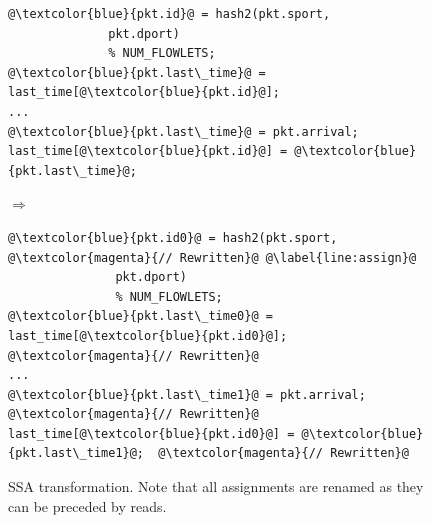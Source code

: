 \begin{figure}[!t]
  \begin{minipage}{\textwidth}
  \begin{minipage}{0.4\textwidth}
  \begin{small}
  \begin{lstlisting}[style=customc, numbers=none, frame=none]
@\textcolor{blue}{pkt.id}@ = hash2(pkt.sport,
              pkt.dport)
              % NUM_FLOWLETS;
@\textcolor{blue}{pkt.last\_time}@ = last_time[@\textcolor{blue}{pkt.id}@];
...
@\textcolor{blue}{pkt.last\_time}@ = pkt.arrival;
last_time[@\textcolor{blue}{pkt.id}@] = @\textcolor{blue}{pkt.last\_time}@;
  \end{lstlisting}
  \end{small}
  \end{minipage}
  $\Longrightarrow$
  \hspace{-0.2in}
%
  \begin{minipage}{0.6\textwidth}
  \begin{small}
  \begin{lstlisting}[style=customc, numbers=none, frame=none]
@\textcolor{blue}{pkt.id0}@ = hash2(pkt.sport,          @\textcolor{magenta}{// Rewritten}@ @\label{line:assign}@
               pkt.dport)
               % NUM_FLOWLETS;  
@\textcolor{blue}{pkt.last\_time0}@ = last_time[@\textcolor{blue}{pkt.id0}@];  @\textcolor{magenta}{// Rewritten}@
...
@\textcolor{blue}{pkt.last\_time1}@ = pkt.arrival;        @\textcolor{magenta}{// Rewritten}@
last_time[@\textcolor{blue}{pkt.id0}@] = @\textcolor{blue}{pkt.last\_time1}@;  @\textcolor{magenta}{// Rewritten}@
  \end{lstlisting}
  \end{small}
  \end{minipage}
  \caption[title]{SSA transformation. Note that all assignments are renamed as they can be preceded by reads.}
  \label{fig:ssa}
\end{minipage}
\end{figure}


